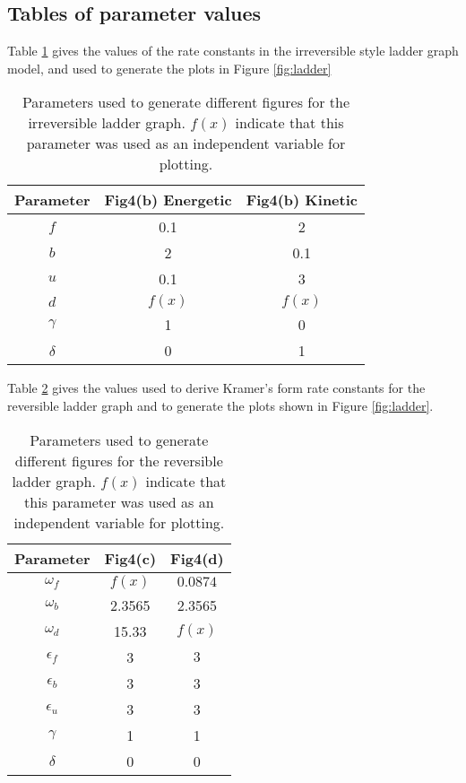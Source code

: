 \subsection{Tables of parameter values}
Table \ref{tab:irr_ladder} gives the values of the rate constants in the irreversible style ladder graph model, and used to generate the plots in Figure \ref{fig:ladder}
\begin{table}[htbp]
\begin{center}
\begin{tabular}{|c|c|c|}
\hline
Parameter & Fig4(b) Energetic & Fig4(b) Kinetic\\
\hline
$f$&0.1&2\\
$b$&2&0.1\\
$u$&0.1&3\\
$d$&$f(x)$&$f(x)$\\
$\gamma$&1&0\\
$\delta$&0&1\\
\hline
\end{tabular}
\end{center}
\caption{Parameters used to generate different figures for the irreversible ladder graph.  $f(x)$ indicate that this parameter was used as an independent variable for plotting. \label{tab:irr_ladder}}
\end{table}%
Table \ref{tab:rev_ladder} gives the values used to derive Kramer's form rate constants for the reversible ladder graph and to generate the plots shown in Figure \ref{fig:ladder}.
\begin{table}[htbp]
\begin{center}
\begin{tabular}{|c|c|c|}
\hline
Parameter & Fig4(c) & Fig4(d)\\
\hline
$\omega_f$&$f(x)$&$0.0874$\\
$\omega_b$&2.3565&2.3565\\
$\omega_d$&15.33&$f(x)$\\
$\epsilon_f$&3&$3$\\
$\epsilon_b$&3&3\\
$\epsilon_u$&3&3\\
$\gamma$&1&1\\
$\delta$&0&0\\
\hline
\end{tabular}
\end{center}
\caption{Parameters used to generate different figures for the reversible ladder graph.  $f(x)$ indicate that this parameter was used as an independent variable for plotting.  \label{tab:rev_ladder}}
\end{table}%
